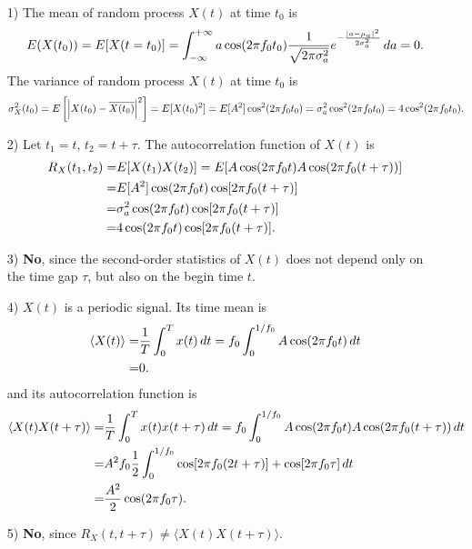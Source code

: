 \documentclass{assignment}
\begin{document}
\begin{sol}
    \begin{itemize}
        \item[1)] The mean of random process $X(t)$ at time $t_0$ is
        \begin{align}
            E(X(t_0))=E[X(t=t_0)]=\int_{-\infty}^{+\infty}a\cos(2\pi f_0t_0)\frac{1}{\sqrt{2\pi\sigma_a^2}}e^{-\frac{\left\lvert a-\mu_a\right\rvert^2}{2\sigma_a^2}}\,da=0.
        \end{align}
        The variance of random process $X(t)$ at time $t_0$ is
        \begin{align}
            \sigma_X^2(t_0)=E\left[\left\lvert X(t_0)-\overline{X(t_0)}\right\rvert^2\right]=E[X(t_0)^2]=E[A^2]\cos^2(2\pi f_0t_0)=\sigma_a^2\cos^2(2\pi f_0t_0)=4\cos^2(2\pi f_0t_0).
        \end{align}
        \item[2)] Let $t_1=t$, $t_2=t+\tau$. The autocorrelation function of $X(t)$ is
        \begin{align}
            \notag R_X(t_1,t_2)=&E[X(t_1)X(t_2)]=E[A\cos(2\pi f_0t)A\cos(2\pi f_0(t+\tau))]\\
            \notag=&E[A^2]\cos(2\pi f_0t)\cos[2\pi f_0(t+\tau)]\\
            \notag=&\sigma_a^2\cos(2\pi f_0t)\cos[2\pi f_0(t+\tau)]\\
            =&4\cos(2\pi f_0t)\cos[2\pi f_0(t+\tau)].
        \end{align}
        \item[3)] \textbf{No}, since the second-order statistics of $X(t)$ does not depend only on the time gap $\tau$, but also on the begin time $t$.
        \item[4)] $X(t)$ is a periodic signal. Its time mean is
        \begin{align}
            \notag\langle X(t)\rangle=&\frac{1}{T}\int_0^Tx(t)\,dt=f_0\int_0^{1/f_0}A\cos(2\pi f_0t)\,dt\\
            =&0.
        \end{align}
        and its autocorrelation function is
        \begin{align}
            \notag\langle X(t)X(t+\tau)\rangle=&\frac{1}{T}\int_0^Tx(t)x(t+\tau)\,dt=f_0\int_0^{1/f_0}A\cos(2\pi f_0t)A\cos(2\pi f_0(t+\tau))\,dt\\
            \notag=&A^2f_0\frac{1}{2}\int_0^{1/f_0}\cos[2\pi f_0(2t+\tau)]+\cos[2\pi f_0\tau]\,dt\\
            =&\frac{A^2}{2}\cos(2\pi f_0\tau).
        \end{align}
        \item[5)] \textbf{No}, since $R_X(t,t+\tau)\neq\langle X(t)X(t+\tau)\rangle$.
    \end{itemize}
\end{sol}
\end{document}
